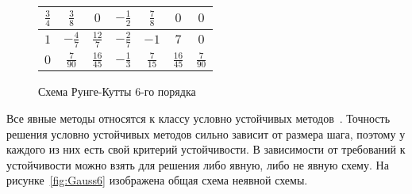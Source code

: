 \begin{figure}
\begin{minipage}[t]{7.5cm}
\begin{table}
\begin{tabular}{|c|c|c|c|c|c|c|}
            $\frac{3}{4}$ & $\frac{3}{8}$ & $0$ & $-\frac{1}{2}$ & $\frac{7}{8}$ & $0$ & $0$\\
            \hline
            $1$ & $-\frac{4}{7}$ & $\frac{12}{7}$ & $-\frac{2}{7}$ & $-1$ & $7$ & $0$\\
            \hline
            $0$ &  $\frac{7}{90}$ &  $\frac{16}{45}$ &  $-\frac{1}{3}$ &  $\frac{7}{15}$ &  $\frac{16}{45}$ &  $\frac{7}{90}$\\
            \hline
            \end{tabular}
        \end{table}
    \end{minipage}
    \caption{Схема Рунге-Кутты 6-го порядка}
    \label{fig:RungeKutta6}
\end{figure}

Все явные методы относятся к классу условно устойчивых методов~\cite{Wikipedia11, Wikipedia12}. Точность решения условно устойчивых методов сильно зависит от размера шага, поэтому у каждого из них есть свой критерий устойчивости. В зависимости от требований к устойчивости можно взять для решения либо явную, либо не явную схему. На рисунке~\ref{fig:Gauss6} изображена общая схема неявной схемы.

